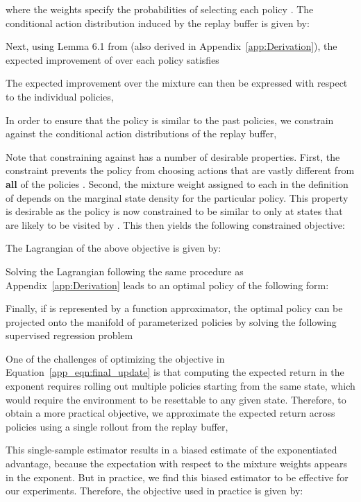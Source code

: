 \documentclass{article} \usepackage{iclr2020_conference,times}
\begin{document}
where the weights  specify the probabilities of selecting each policy . The conditional action distribution  induced by the replay buffer is given by:


Next, using Lemma 6.1 from \citet{Kakade2002} (also derived in Appendix~\ref{app:Derivation}), the expected improvement of  over each policy  satisfies

The expected improvement over the mixture can then be expressed with respect to the individual policies,


In order to ensure that the policy  is similar to the past policies, we constrain  against the conditional action distributions of the replay buffer,

Note that constraining  against  has a number of desirable properties. First, the constraint prevents the policy  from choosing actions that are vastly different from \textbf{all} of the policies . Second, the mixture weight assigned to each  in the definition of  depends on the marginal state density  for the particular policy. This property is desirable as the policy  is now constrained to be similar to  only at states that are likely to be visited by . This then yields the following constrained objective:

The Lagrangian of the above objective is given by:

Solving the Lagrangian following the same procedure as Appendix~\ref{app:Derivation} leads to an optimal policy of the following form:

Finally, if  is represented by a function approximator, the optimal policy  can be projected onto the manifold of parameterized policies by solving the following supervised regression problem

One of the challenges of optimizing the objective in Equation~\ref{app_eqn:final_update} is that computing the expected return in the exponent requires rolling out multiple policies starting from the same state, which would require the environment to be resettable to any given state. Therefore, to obtain a more practical objective, we approximate the expected return across policies using a single rollout from the replay buffer,

This single-sample estimator results in a biased estimate of the exponentiated advantage, because the expectation with respect to the mixture weights appears in the exponent. But in practice, we find this biased estimator to be effective for our experiments.
Therefore, the objective used in practice is given by:
\end{document}
